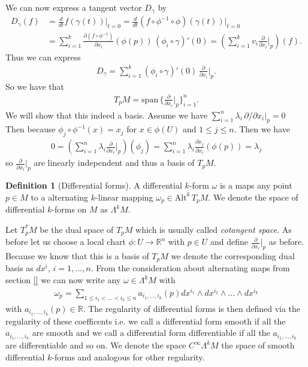 \documentclass[12pt,a4paper]{article}
\numberwithin{equation}{subsection}
\numberwithin{lemma}{subsection}
\theoremstyle{definition}
\newtheorem{definition}[lemma]{Definition}
\newcommand{\alternating}[2]{ {\text{Alt}^{#1}\,#2} }
\newcommand{\real}{\mathbb{R}}
\begin{document}
We can now 
express a tangent vector $D_\gamma$ by 
\begin{align}
    D_\gamma(f) &=  \frac{d}{dt} f(\gamma(t)) \big|_{t=0}
    =  \frac{d}{dt} (f \circ \phi^{-1} \circ \phi)  (\gamma(t)) \big|_{t=0}
    \\ &= \sum\limits_{i=1}^k \frac{\partial (f \circ \phi^{-1})}{\partial x_i} 
        (\phi(p))
        \, (\phi_i\circ \gamma)'(0)
    = (\sum\limits_{i=1}^k v_i  \frac{\partial}{\partial x_i}\Big|_p )(f).
\end{align}
Thus we can express 
\begin{align*}
    D_\gamma = \sum\limits_{i=1}^k 
    (\phi_i \circ \gamma)' (0) \, \frac{\partial}{\partial x_i}\bigg|_p.
\end{align*}
So we have that 
\begin{align*}
    T_p M = \text{span}\, 
        \bigg\{ \frac{\partial}{\partial x_i}\bigg|_p \bigg\}_{i=1}^n.
\end{align*}
We will show that this indeed a basis. 
Assume we have $\sum_{i=1}^n \lambda_i \, \partial/\partial x_i|_p = 0$
Then because $\phi_j \circ \phi^{-1} (x) = x_j$ for $x \in \phi(U)$ and 
$1 \leq j \leq n$. Then we have 
\begin{align*}
    0 = \left( \sum\limits_{i=1}^n \lambda_i \frac{\partial}{\partial x_i}|_p
        \right) (\phi_j)
    = \sum\limits_{i=1}^n \lambda_i \frac{\partial x_j}{\partial x_i}(\phi(p))
    = \lambda_j
\end{align*}
so $\frac{\partial}{\partial x_i}|_p $ are
linearly independent and thus a basis of $T_p M$. 

\begin{definition}[Differential forms]
    A differential $k$-form $\omega$ is a maps any point $p \in M$ to a 
    alternating $k$-linear mapping $\omega_p \in \alternating{k}{T_p M}$.
    We denote the space of differential $k$-forms on $M$ as $\Lambda^k M$.
\end{definition}

Let $T_p^* M$ be the dual space of $T_p M$ which is usually called 
\textit{cotangent space}.
As before let us choose a local chart $\phi: U \rightarrow \real^n$ with 
$p \in U$ and define $\frac{\partial}{\partial x_i}|_p$ as before. 
Because we know that this is a basis of $T_p M$ we denote the corresponding
dual basis as $dx^i$, $i = 1,...,n$. From the consideration about
alternating maps from section \ref{} we can now write any 
$\omega \in \Lambda^k M$ with 
\begin{align*}
    \omega_p = \sum\limits_{1\leq i_1 < ... < i_k \leq n} 
        a_{i_1,...,i_k}(p) dx^{i_1} \wedge dx^{i_2} \wedge ... \wedge dx^{i_k}
\end{align*}
with $a_{i_1,...,i_k}(p) \in \real$. The regularity of differential forms 
is then defined via the regularity of these coefficents i.e. we call 
a differential form smooth if all the $a_{i_1,...,i_k}$ are smooth 
and we call a differential form differentiable if all the $a_{i_1,...,i_k}$
are differentiable and so on. We denote the space $C^\infty \Lambda^k M$ the 
space of smooth differential $k$-forms and analogous for other regularity.
\end{document}
